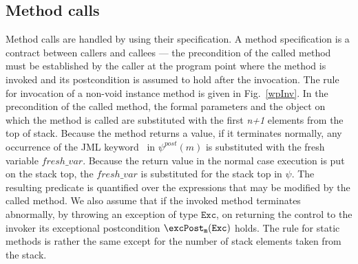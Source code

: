 \subsection{Method calls}
Method calls are handled by using their specification. A method specification is a contract between callers and callees --- the precondition of the called method
must be established by the caller at the program point where the method is invoked and its postcondition is assumed to hold after the invocation. The rule for
invocation of a non-void instance method is given in Fig.~\ref{wpInv}. In the precondition of the called method, the formal parameters and the object on which the method is called are substituted with the first \textit{n+1} elements from the top of stack. 
Because the method returns a value, if it terminates normally, any occurrence of the JML keyword \result \ in $\psi^{post}(m)$ is substituted with the fresh variable $fresh\_var$.  
Because the return value in the normal case execution is put on the stack top, the $fresh\_var$ is substituted for the stack top in $\psi$. The resulting predicate is quantified over the expressions that may be modified by the called method. We also assume that if the invoked method terminates abnormally, by throwing an exception of type $\texttt{Exc}$, on returning the control to the invoker its exceptional postcondition $\excPost_{\tt{m} }( \tt{Exc} )$ holds. 
The rule for static methods is rather the same except for the number of stack elements taken from the stack.  

